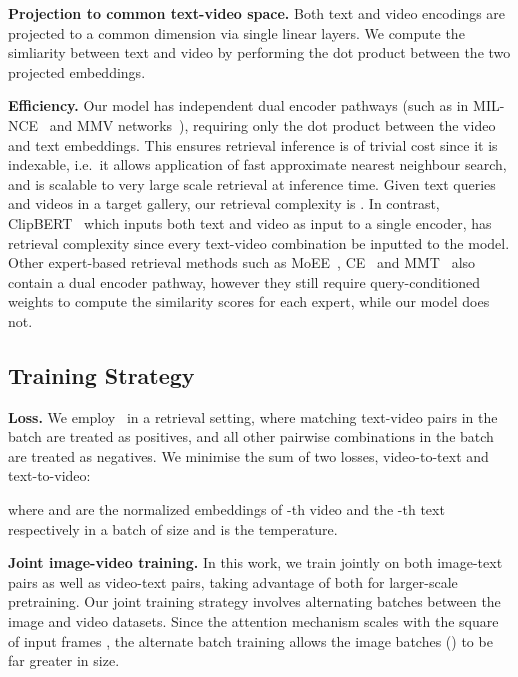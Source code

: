 \documentclass[10pt,twocolumn,letterpaper]{article}
\begin{document}
\noindent\textbf{Projection to common text-video space.}
Both text and video encodings are projected to a common dimension via single linear layers. We compute the simliarity between text and video by performing the dot product between the two projected embeddings.

\noindent\textbf{Efficiency.} Our model has independent dual encoder pathways (such as in MIL-NCE~\cite{miech20endtoend} and MMV networks~\cite{alayrac2020self}), requiring only the dot product between the video and text embeddings. This ensures retrieval inference is of trivial cost since it is indexable, i.e.\ it allows application of fast approximate nearest neighbour search, and is scalable to very large scale retrieval at inference time. Given  text queries and  videos in a target gallery, our retrieval complexity is . In contrast, ClipBERT~\cite{lei2021less} which inputs both text and video as input to a single encoder, has retrieval complexity  since every text-video combination be inputted to the model. Other expert-based retrieval methods such as MoEE~\cite{miech18learning}, CE~\cite{Liu19a} and MMT~\cite{gabeur2020multi} also contain a dual encoder pathway, however they still require query-conditioned weights to compute the similarity scores for each expert, while our model does not.




\subsection{Training Strategy}
\label{subsec:training}

\noindent\textbf{Loss.}
We employ~\cite{Zhai2019ClassificationIA} in a retrieval setting, where matching text-video pairs in the batch are treated as positives, and all other pairwise combinations in the batch are treated as negatives. We minimise the sum of two losses,
video-to-text
and text-to-video:


where  and  are the normalized embeddings of -th video and the -th text respectively in a batch of size  and  is the temperature.


\noindent\textbf{Joint image-video training.} In this work, we train jointly on both image-text pairs as well as video-text pairs, taking advantage of both for larger-scale pretraining. Our joint training strategy involves alternating batches between the image and video datasets. Since the attention mechanism scales with the square of input frames , the alternate batch training allows the image batches () to be far greater in size. 
\end{document}
